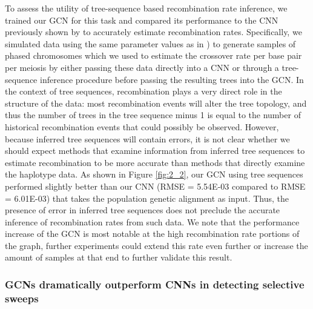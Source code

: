 To assess the utility of tree-sequence based recombination rate inference, we trained our GCN for this task and compared its performance to the CNN previously shown by \cite{flagelUnreasonableEffectivenessConvolutional2019} to accurately estimate recombination rates. Specifically, we simulated data using the same parameter values as in \cite{flagelUnreasonableEffectivenessConvolutional2019}) to generate samples of phased chromosomes which we used to estimate the crossover rate per base pair per meiosis by either passing these data directly into a CNN or through a tree-sequence inference procedure before passing the resulting trees into the GCN. In the context of tree sequences, recombination plays a very direct role in the structure of the data: most recombination events will alter the tree topology, and thus the number of trees in the tree sequence minus 1 is equal to the number of historical recombination events that could possibly be observed. However, because inferred tree sequences will contain errors, it is not clear whether we should expect methods that examine information from inferred tree sequences to estimate recombination to be more accurate than methods that directly examine the haplotype data. As shown in Figure \ref{fig:2_2}, our GCN using tree sequences performed slightly better than our CNN (RMSE = 5.54E-03 compared to RMSE = 6.01E-03) that takes the population genetic alignment as input. Thus, the presence of error in inferred tree sequences does not preclude the accurate inference of recombination rates from such data. We note that the performance increase of the GCN is most notable at the high recombination rate portions of the graph, further experiments could extend this rate even further or increase the amount of samples at that end to further validate this result.

\subsubsection{GCNs dramatically outperform CNNs in detecting selective sweeps}

